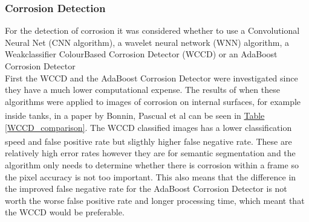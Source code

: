 \documentclass[11pt]{article}		%
\newcommand{\supercite}[1]{\textsuperscript{\cite{#1}}}		%
\newcommand{\tableref}[1]{\hyperref[#1]{Table \ref*{#1}}}     %
\begin{document}
        
        \subsubsection{Corrosion Detection}
 For the detection of corrosion it was considered whether to use a Convolutional Neural Net (CNN algorithm), a wavelet neural network (WNN) algorithm, a Weak­classifier Colour­Based Corrosion Detector (WCCD) or an AdaBoost Corrosion Detector
 \\ \hspace*{3ex}
First the WCCD and the AdaBoost Corrosion Detector were investigated since they have a much lower computational expense. The results of when these algorithms were applied to images of corrosion on internal surfaces, for example inside tanks, in a paper by Bonnin, Pascual et al\supercite{WCCD} can be seen in \tableref{WCCD_comparison}. The WCCD classified images has a lower classification speed and false positive rate but sligthly higher false negative rate.\supercite{WCCD} These are relatively high error rates however they are for semantic segmentation and the algorithm only needs to determine whether there is corrosion within a frame so the pixel accuracy is not too important. This also means that the difference in the improved false negative rate for the AdaBoost Corrosion Detector is not worth the worse false positive rate and longer processing time, which meant that the WCCD would be preferable. 
\\ \hspace*{3ex}
\end{document}
